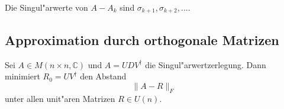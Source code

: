 \documentclass[8pt, a4paper, twocolumn, landscape]{article}
\begin{document}
{\begin{remark}
Die Singul"arwerte von $A - A_k$ sind $\sigma_{k+1}, \sigma_{k+2}, ... .$
\end{remark}

\subsection{Approximation durch orthogonale Matrizen}
\begin{theorem}
Sei $A \in M(n \times n, \mathbb{C})$ und $A = UDV^\dagger$ die Singul"arwertzerlegung. Dann minimiert $R_0 = UV^\dagger$ den Abstand 
$$
\|A - R\|_F
$$
unter allen unit"aren Matrizen $R \in U(n)$.
\end{theorem}
}
\end{document}
